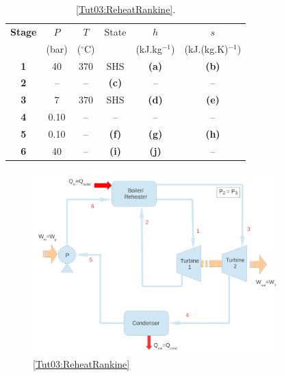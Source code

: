 \documentclass[12pts,a4paper,amsmath,amssymb,floatfix]{article}%
\begin{document}
\begin{enumerate}[label=\bfseries Problem \arabic*]
         \begin{table}[h]
       \begin{center}
         \begin{tabular}{c | c c c c c  }
           \hline
           {\bf Stage} & $P$    & $T$             &  State            & $h$                 & $s$                      \\
                       & (bar)  & ($^{\circ}$C)    &                   & (kJ.kg$^{-1}$)       & (kJ.(kg.K)$^{-1}$)        \\
           \hline
            {\bf 1 }   & 40         & 370         & SHS               & {\bf (a)}           & {\bf (b)}                 \\
            {\bf 2 }   &  --        &  --         & {\bf (c)}         & --                  &   --                      \\
            {\bf 3 }   & 7          & 370         & SHS               & {\bf (d)}           & {\bf (e)}                 \\
            {\bf 4 }   & 0.10       & --          &     --            & --                   & --                      \\
            {\bf 5 }   & 0.10       & --          &   {\bf (f)}       & {\bf (g)}           & {\bf (h)}                 \\
            {\bf 6 }   & 40         & --          &   {\bf (i)}       & {\bf (j)}           & --                       \\
           \hline
         \end{tabular}
          \caption{\ref{Tut03:ReheatRankine}.}\label{Table_Tut03:ReheatRankine}
        \end{center}
         \end{table} 
    
           \begin{figure}[h]
         \begin{center}
            \includegraphics[width=9.5cm,clip]{./Pics/Exam_Reheat_Rankine_Cycle}
          \caption{\ref{Tut03:ReheatRankine}}\label{Fig_Tut03:ReheatRankine}
         \end{center}
           \end{figure}


\end{enumerate}
\end{document}
